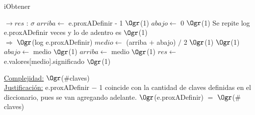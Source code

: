 \begin{Representacion}
	\begin{algorithm}[H]
		\caption{iObtener}
		\begin{algorithmic}
			 $\to res$ : $\sigma$
				\State $arriba \gets$ e.proxADefinir - 1 \Comment $\Ogr$(1)
				\State $abajo \gets$ 0 \Comment $\Ogr$(1)
				 \Comment Se repite log e.proxADefinir veces y lo de adentro es $\Ogr$(1)\\
				 \hfill $\Rightarrow$ $\Ogr$(log e.proxADefinir)
					\State $	medio \gets$ (arriba $+$ abajo) $/$ 2 \Comment $\Ogr$(1)
					 \Comment $\Ogr$(1)
						\State $abajo \gets$ medio \Comment $\Ogr$(1)
					\Else
						\State $arriba \gets$ medio \Comment $\Ogr$(1)
					\EndIf
				\EndWhile
				\State $res \gets$ e.valores[medio].significado \Comment $\Ogr$(1)
			\EndProcedure
		\end{algorithmic}
		\underline{Complejidad:} $\Ogr$($\#$claves)\\
		\underline{Justificación:} e.proxADefinir $-$ 1 coincide con la cantidad de claves definidas en el diccionario, pues se van agregando adelante. $\Ogr$(e.proxADefinir) $=$ $\Ogr$($\#$claves)
	\end{algorithm}
	
\end{Representacion}